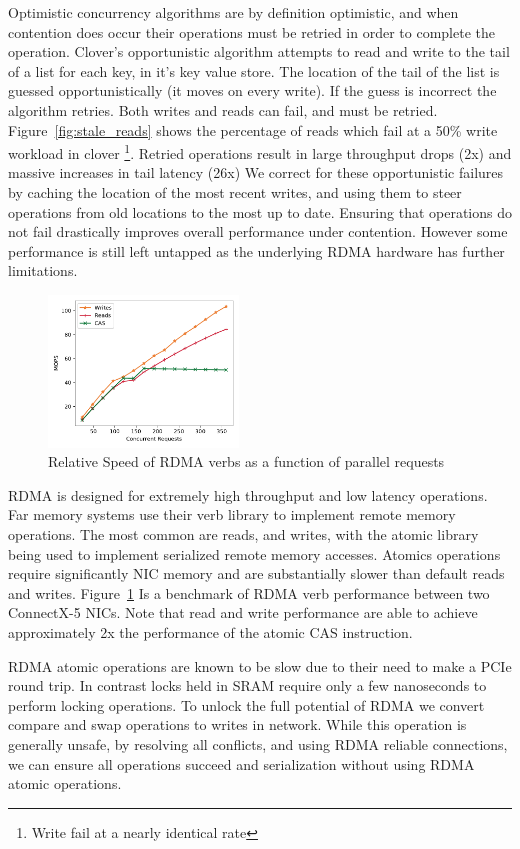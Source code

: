 Optimistic concurrency algorithms are by definition optimistic, and when
contention does occur their operations must be retried in order to complete the
operation. Clover's opportunistic algorithm attempts to read and write to the
tail of a list for each key, in it's key value store. The location of the tail
of the list is guessed opportunistically (it moves on every write). If the guess
is incorrect the algorithm retries. Both writes and reads can fail, and must be
retried. Figure~\ref{fig:stale_reads} shows the percentage of reads which fail
at a 50\% write workload in clover \footnote{Write fail at a nearly identical
rate}. Retried operations result in large throughput drops (2x) and massive
increases in tail latency (26x) We correct for these opportunistic failures by
caching the location of the most recent writes, and using them to steer
operations from old locations to the most up to date. Ensuring that operations
do not fail drastically improves overall performance under contention. However
some performance is still left untapped as the underlying RDMA hardware has
further limitations. 

\begin{figure}[t]
    \includegraphics[width=0.45\textwidth]{fig/rdma_concur.pdf}
    \caption{Relative Speed of RDMA verbs as a function of parallel requests}
    \label{fig:rdma_concur}
\end{figure}

RDMA is designed for extremely high throughput and low latency operations. Far
memory systems use their verb library to implement remote memory operations. The
most common are reads, and writes, with the atomic library being used to
implement serialized remote memory accesses. Atomics operations require
significantly NIC memory and are substantially slower than default reads and
writes. Figure~\ref{fig:rdma_concur} Is a benchmark of RDMA verb performance
between two ConnectX-5 NICs. Note that read and write performance are able to
achieve approximately 2x the performance of the atomic CAS instruction.

RDMA atomic operations are known to be slow due to their need to make a PCIe
round trip. In contrast locks held in SRAM require only a few nanoseconds to
perform locking operations. To unlock the full potential of RDMA we convert
compare and swap operations to writes in network. While this operation is
generally unsafe, by resolving all conflicts, and using RDMA reliable
connections, we can ensure all operations succeed and serialization without
using RDMA atomic operations.









